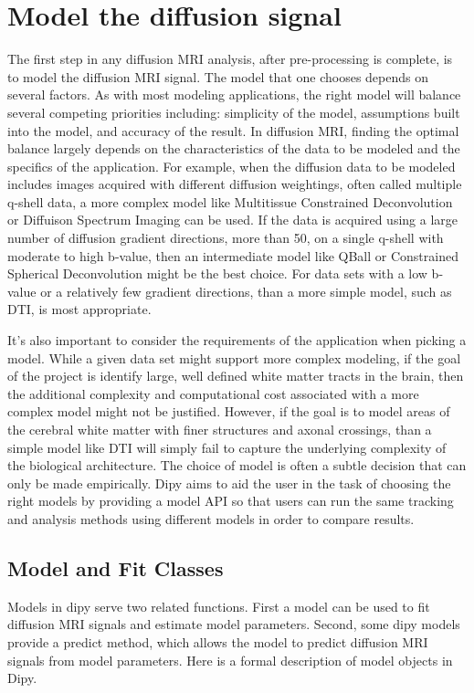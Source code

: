 \section{Model the diffusion signal}
The first step in any diffusion MRI analysis, after pre-processing is complete, is to model the diffusion MRI signal. The model that one chooses depends on several factors. As with most modeling applications, the right model will balance several competing priorities including: simplicity of the model, assumptions built into the model, and accuracy of the result. In diffusion MRI, finding the optimal balance largely depends on the characteristics of the data to be modeled and the specifics of the application. For example, when the diffusion data to be modeled includes images acquired with different diffusion weightings, often called multiple q-shell data, a more complex model like Multitissue Constrained Deconvolution or Diffuison Spectrum Imaging can be used. If the data is acquired using a large number of diffusion gradient directions, more than 50, on a single q-shell with moderate to high b-value, then an intermediate model like QBall or Constrained Spherical Deconvolution might be the best choice. For data sets with a low b-value or a relatively few gradient directions, than a more simple model, such as DTI, is most appropriate. 

It's also important to consider the requirements of the application when picking a model. While a given data set might support more complex modeling, if the goal of the project is identify large, well defined white matter tracts in the brain, then the additional complexity and computational cost associated with a more complex model might not be justified. However, if the goal is to model areas of the cerebral white matter with finer structures and axonal crossings, than a simple model like DTI will simply fail to capture the underlying complexity of the biological architecture. The choice of model is often a subtle decision that can only be made empirically. Dipy aims to aid the user in the task of choosing the right models by providing a model API so that users can run the same tracking and analysis methods using different models in order to compare results.

\subsection{Model and Fit Classes}
Models in dipy serve two related functions. First a model can be used to fit diffusion MRI signals and estimate model parameters. Second, some dipy models provide a predict method, which allows the model to predict diffusion MRI signals from model parameters. Here is a formal description of model objects in Dipy.

